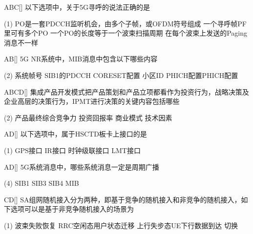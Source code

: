 \begin{choice}{\;ABC\;}[]
    以下选项中，关于5G寻呼的说法正确的是
    \begin{tasks}(1)
        \task PO是一套PDCCH监听机会，由多个子帧，或OFDM符号组成
        \task 一个寻呼帧PF里可有多个PO
        \task 一个PO的长度等于一个波束扫描周期
        \task 在每个波束上发送的Paging消息不一样
    \end{tasks}
\end{choice}

\begin{choice}{\;AB\;}[]
    5G NR系统中，MIB消息中包含以下哪些内容
    \begin{tasks}(2)
        \task 系统帧号
        \task SIB1的PDCCH CORESET配置
        \task 小区ID
        \task PHICH配置PHICH配置
    \end{tasks}
\end{choice}

\begin{choice}{\;ABCD\;}[]
    集成产品开发模式把产品策划和产品立项都看作为投资行为，战略决策及企业高层的决策行为，IPMT进行决策的关键内容包括哪些
    \begin{tasks}(2)
        \task 产品最终综合竞争力
        \task 投资回报率
        \task 商业模式
        \task 技术因素
    \end{tasks}
\end{choice}

\begin{choice}{\;AD\;}[]
    以下选项中，属于HSCTD板卡上接口的是
    \begin{tasks}(1)
        \task GPS接口
        \task IR接口
        \task  时钟级联接口
        \task LMT接口
    \end{tasks}
\end{choice}

\begin{choice}{\;AD\;}[]
    5G系统消息中，哪些系统消息一定是周期广播
    \begin{tasks}(4)
        \task SIB1
        \task SIB3
        \task SIB4
        \task MIB
    \end{tasks}
\end{choice}

\begin{choice}{\;CD\;}[]
    SA组网随机接入分为两种，即基于竞争的随机接入和非竞争的随机接入，如下选项可以是基于非竞争随机接入的场景为
    \begin{tasks}(1)
        \task 波束失败恢复
        \task RRC空闲态用户状态迁移
        \task 上行失步态UE下行数据到达
        \task 切换
    \end{tasks}
\end{choice}

